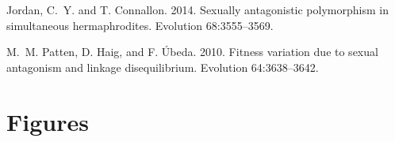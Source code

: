 \documentclass{article}
\begin{document}
\newpage{}



\begin{thebibliography}{}

Jordan, C.~Y. and T. Connallon. 2014.
\newblock Sexually antagonistic polymorphism in simultaneous hermaphrodites.
\newblock Evolution 68:3555--3569.

M.~M. Patten, D. Haig, and F. \'{U}beda. 2010.
\newblock Fitness variation due to sexual antagonism and linkage disequilibrium.
\newblock Evolution 64:3638--3642.


\end{thebibliography}

\newpage{}




\section*{Figures}
 



\renewcommand{\thefigure}{A\arabic{figure}}
\setcounter{figure}{0}

\end{document}
